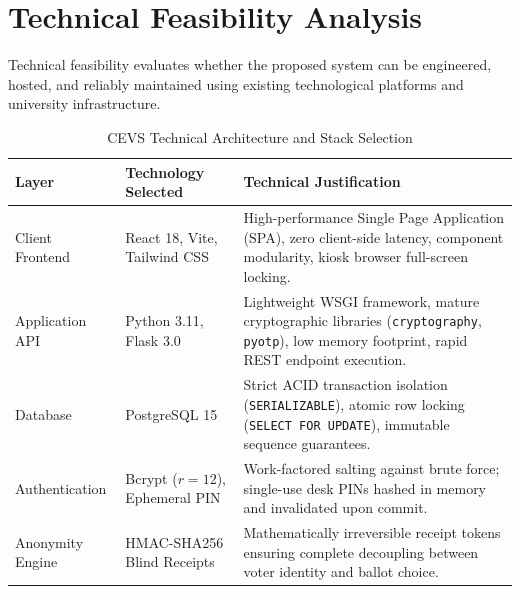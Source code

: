 \documentclass[12pt,a4paper,oneside]{report}
\begin{document}
\section{Technical Feasibility Analysis}
Technical feasibility evaluates whether the proposed system can be engineered, hosted, and reliably maintained using existing technological platforms and university infrastructure.

\begin{table}[H]
    \centering
    \caption{CEVS Technical Architecture and Stack Selection}
    \label{tab:tech_stack}
    \begin{tabularx}{\textwidth}{l p{3.8cm} X}
        \toprule
        \textbf{Layer} & \textbf{Technology Selected} & \textbf{Technical Justification} \\
        \midrule
        Client Frontend & React 18, Vite, Tailwind CSS & High-performance Single Page Application (SPA), zero client-side latency, component modularity, kiosk browser full-screen locking. \\
        Application API & Python 3.11, Flask 3.0 & Lightweight WSGI framework, mature cryptographic libraries (\texttt{cryptography}, \texttt{pyotp}), low memory footprint, rapid REST endpoint execution. \\
        Database & PostgreSQL 15 & Strict ACID transaction isolation (\texttt{SERIALIZABLE}), atomic row locking (\texttt{SELECT FOR UPDATE}), immutable sequence guarantees. \\
        Authentication & Bcrypt ($r=12$), Ephemeral PIN & Work-factored salting against brute force; single-use desk PINs hashed in memory and invalidated upon commit. \\
        Anonymity Engine & HMAC-SHA256 Blind Receipts & Mathematically irreversible receipt tokens ensuring complete decoupling between voter identity and ballot choice. \\
        \bottomrule
    \end{tabularx}
\end{table}
\end{document}
